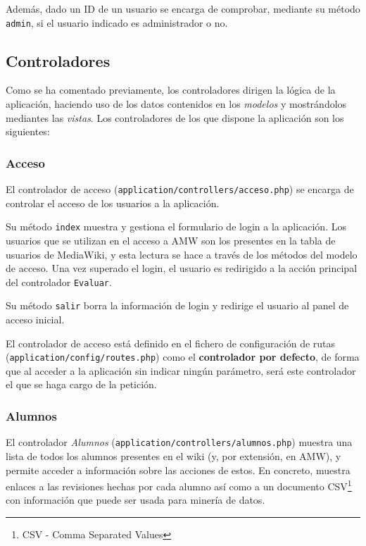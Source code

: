 \documentclass[11pt]{article}
\begin{document}
Además, dado un ID de un usuario se encarga de comprobar, mediante su método
\texttt{admin}, si el usuario indicado es administrador o no.


\subsection{Controladores}

Como se ha comentado previamente, los controladores dirigen la lógica de la
aplicación, haciendo uso de los datos contenidos en los \textit{modelos} y
mostrándolos mediantes las \textit{vistas}. Los controladores de los que dispone
la aplicación son los siguientes:

\subsubsection{Acceso}

El controlador de acceso (\texttt{application/controllers/acceso.php}) se
encarga de controlar el acceso de los usuarios a la aplicación. 

Su método \texttt{index} muestra y gestiona el formulario de login a la
aplicación. Los usuarios que se utilizan en el acceso a AMW son los presentes en
la tabla de usuarios de MediaWiki, y esta lectura se hace a través de los
métodos del modelo de acceso. Una vez superado el login, el usuario es
redirigido a la acción principal del controlador \texttt{Evaluar}.

Su método \texttt{salir} borra la información de login y redirige el usuario al
panel de acceso inicial.

El controlador de acceso está definido en el fichero de configuración de rutas
(\texttt{application/config/routes.php}) como el \textbf{controlador por
  defecto}, de forma que al acceder a la aplicación sin indicar ningún
parámetro, será este controlador el que se haga cargo de la petición.

\subsubsection{Alumnos}

El controlador \textit{Alumnos} (\texttt{application/controllers/alumnos.php})
muestra una lista de todos los alumnos presentes en el wiki (y, por extensión,
en AMW), y permite acceder a información sobre las acciones de estos. En
concreto, muestra enlaces a las revisiones hechas por cada alumno así como a un
documento CSV\footnote{CSV - Comma Separated Values} con información que puede
ser usada para minería de datos.
\end{document}
